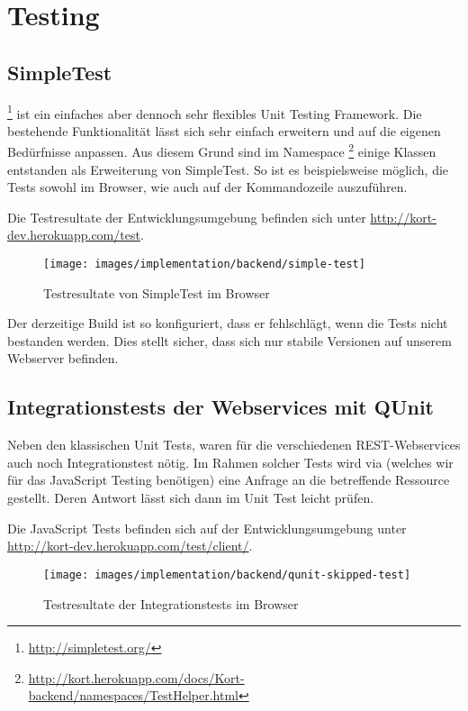 \section{Testing}

\subsection{SimpleTest}
\footnote{\url{http://simpletest.org/}} ist ein einfaches aber dennoch sehr flexibles Unit Testing Framework.
Die bestehende Funktionalität lässt sich sehr einfach erweitern und auf die eigenen Bedürfnisse anpassen.
Aus diesem Grund sind im Namespace \footnote{\url{http://kort.herokuapp.com/docs/Kort-backend/namespaces/TestHelper.html}} einige Klassen entstanden als Erweiterung von SimpleTest.
So ist es beispielsweise möglich, die Tests sowohl im Browser, wie auch auf der Kommandozeile auszuführen.

Die Testresultate der Entwicklungsumgebung befinden sich unter \url{http://kort-dev.herokuapp.com/test}.

\begin{figure}[H]
	\centering
	\texttt{[image: images/implementation/backend/simple-test]}
	\caption{Testresultate von SimpleTest im Browser}
	\label{image-simple-test}
\end{figure}

Der derzeitige Build ist so konfiguriert, dass er fehlschlägt, wenn die Tests nicht bestanden werden.
Dies stellt sicher, dass sich nur stabile Versionen auf unserem Webserver befinden.

\subsection{Integrationstests der Webservices mit QUnit}
Neben den klassischen Unit Tests, waren für die verschiedenen \gls{REST}-Webservices auch noch Integrationstest nötig.
Im Rahmen solcher Tests wird via  (welches wir für das JavaScript Testing benötigen) eine Anfrage an die betreffende Ressource gestellt.
Deren Antwort lässt sich dann im Unit Test leicht prüfen.

Die JavaScript Tests befinden sich auf der Entwicklungsumgebung unter \url{http://kort-dev.herokuapp.com/test/client/}.

\begin{figure}[H]
	\centering
	\texttt{[image: images/implementation/backend/qunit-skipped-test]}
	\caption{Testresultate der Integrationstests im Browser}
	\label{image-qunit-skipped-test}
\end{figure}